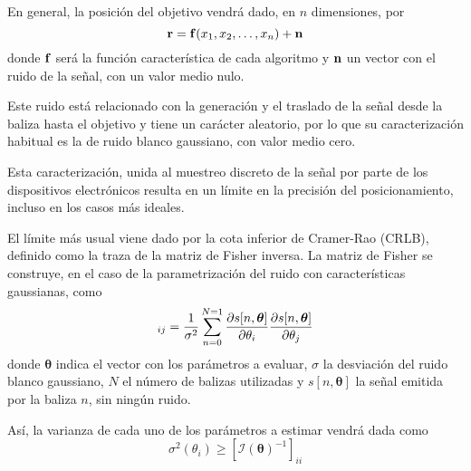 En general, la posición del objetivo vendrá dado, en $n$ dimensiones, por
\begin{equation}\label{eq:geom}
    \vb{r} = \vb{f}(x_1, x_2, \ldots, x_n) + \vb{n}
\end{equation}
donde $\vb{f}$ será la función característica de cada algoritmo y $\vb{n}$ un vector con el ruido de la señal, con un valor medio nulo.



Este ruido está relacionado con la generación y el traslado de la señal desde la baliza hasta el objetivo y tiene un carácter aleatorio, por lo que su caracterización habitual es la de ruido blanco gaussiano, con valor medio cero.

Esta caracterización, unida al muestreo discreto de la señal por parte de los dispositivos electrónicos resulta en un límite en la precisión del posicionamiento, incluso en los casos más ideales.

El límite más usual viene dado por la cota inferior de Cramer-Rao (CRLB), definido como la traza de la matriz de Fisher inversa.
La matriz de Fisher se construye, en el caso de la parametrización del ruido con características gaussianas, como \cite{Xbook}
\begin{equation}
    [\mathcal{I}(\bm{\theta})]_{ij} = \frac{1}{\sigma^2} \sum_{n=0}^{N=1} \pdv{s[n,\bm{\theta}]}{\theta_i}\pdv{s[n,\bm{\theta}]}{\theta_j}
\end{equation}
donde $\bm{\theta}$ indica el vector con los parámetros a evaluar, $\sigma$ la desviación del ruido blanco gaussiano, $N$ el número de balizas utilizadas y $s[n,\bm{\theta}]$ la señal emitida por la baliza $n$, sin ningún ruido.

Así, la varianza de cada uno de los parámetros a estimar vendrá dada como
\begin{equation}
    \sigma^2(\theta_i) \geq [\mathcal{I}(\bm{\theta})^{-1}]_{ii}
\end{equation}

